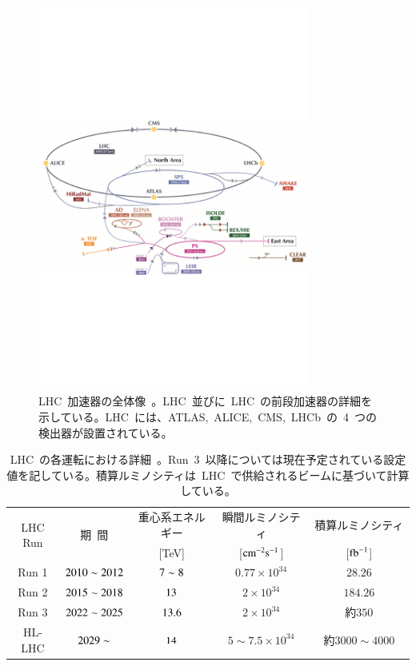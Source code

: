\begin{figure}[H]
        \centering   
        \includegraphics[width=0.8\textwidth]{img/jpeg/lhclhc.pdf}
        \caption[LHC 加速器の全体像]{LHC~加速器の全体像~\cite{URL:01}。LHC~並びに~LHC~の前段加速器の詳細を示している。LHC~には、ATLAS,~ALICE,~CMS,~LHCb~の~4~つの検出器が設置されている。}\label{fig:lhc}
\end{figure}

\begin{table}[tb]
	\centering
	\begin{tabular}{c|cccc}\hline
	    \multirow{2}{*}{LHC Run} & \multirow{2}{*}{期~間} & 重心系エネルギー & 瞬間ルミノシティ & 積算ルミノシティ　\\ 
	     &  & [TeV] & [$\rm{cm}^{-2}\rm{s}^{-1}$] & [$\rm{fb}^{-1}$]　\\ \hline\hline
		Run 1 & $\rm{2010\sim\rm2012}$ & $\rm{7\sim8}$ & $0.77\times10^{34}$ & $28.26$ \\ \hline
		Run 2 & $\rm{2015\sim2018}$ & $\rm{13}$ & $2\times10^{34}$ & $184.26$ \\ \hline
		Run 3 & $\rm{2022\sim2025}$ & $\rm{13.6}$ & $2\times10^{34}$ & 約$350$ \\\hline
		HL-LHC & $\rm{2029\sim}$ & $\rm{14}$ & $5\sim7.5\times10^{34}$ & 約$3000\sim4000$ \\ \hline
	\end{tabular}
	\caption[LHC の各運転における詳細]{LHC~の各運転における詳細~\cite{URL:18,URL:17}。Run~3~以降については現在予定されている設定値を記している。積算ルミノシティは~LHC~で供給されるビームに基づいて計算している。}
    \label{tb:LHC}
\end{table}

